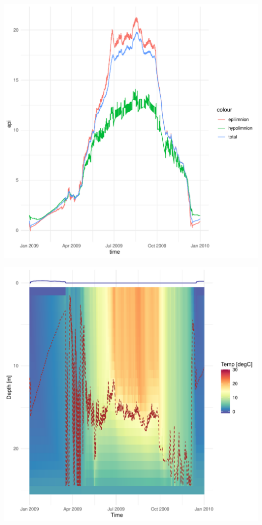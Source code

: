 \documentclass{tufte-handout}\usepackage[]{graphicx}\usepackage[]{xcolor}
\makeatletter
\def\maxwidth{ %
  \ifdim\Gin@nat@width>\linewidth
    \linewidth
  \else
    \Gin@nat@width
  \fi
}
\newenvironment{knitrout}{}{} %
\makeatother
\begin{document}
\begin{knitrout}
\color{fgcolor}
\includegraphics[width=\maxwidth]{figure/unnamed-chunk-3-1} 
\end{knitrout}


\begin{knitrout}
\color{fgcolor}
\includegraphics[width=\maxwidth]{figure/unnamed-chunk-4-1} 
\end{knitrout}
\end{document}
